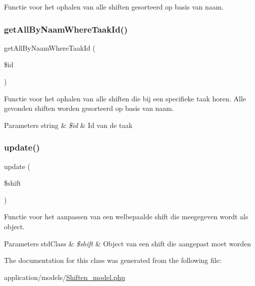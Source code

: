 Functie voor het ophalen van alle shiften gesorteerd op basis van naam. 

\mbox{\label{class_shiften___model_a537c83774b71a66979239cdffbb584d4}} 
\subsubsection{\texorpdfstring{get\+All\+By\+Naam\+Where\+Taak\+Id()}{getAllByNaamWhereTaakId()}}
{\footnotesize\ttfamily get\+All\+By\+Naam\+Where\+Taak\+Id (\begin{DoxyParamCaption}\item[{}]{\$id }\end{DoxyParamCaption})}



Functie voor het ophalen van alle shiften die bij een specifieke taak horen. Alle gevonden shiften worden gesorteerd op basis van naam. 


\begin{DoxyParams}[1]{Parameters}
string & {\em \$id} & Id van de taak \\
\hline
\end{DoxyParams}
\mbox{\label{class_shiften___model_a0275d30c0139203609e59da92dc43790}} 
\subsubsection{\texorpdfstring{update()}{update()}}
{\footnotesize\ttfamily update (\begin{DoxyParamCaption}\item[{}]{\$shift }\end{DoxyParamCaption})}



Functie voor het aanpassen van een welbepaalde shift die meegegeven wordt als object. 


\begin{DoxyParams}[1]{Parameters}
std\+Class & {\em \$shift} & Object van een shift die aangepast moet worden \\
\hline
\end{DoxyParams}


The documentation for this class was generated from the following file\+:\begin{DoxyCompactItemize}
\item 
application/models/\mbox{\hyperlink{_shiften__model_8php}{Shiften\+\_\+model.\+php}}\end{DoxyCompactItemize}
